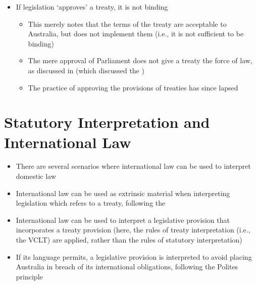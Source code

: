 \begin{itemize}
    \item If legislation `approves' a treaty, it is not binding
    \begin{itemize}
        \item This merely notes that the terms of the treaty are acceptable to Australia, but does not implement them (i.e., it is not sufficient to be binding)
        \item The mere approval of Parliament does not give a treaty the force of law, as discussed in  (which discussed the )
        \item The practice of approving the provisions of treaties has since lapsed
    \end{itemize}
\end{itemize}

\section{Statutory Interpretation and International Law}
\begin{itemize}
    \item There are several scenarios where international law can be used to interpret domestic law
    \item International law can be used as extrinsic material when interpreting legislation which refers to a treaty, following the 
    \item International law can be used to interpret a legislative provision that incorporates a treaty provision (here, the rules of treaty interpretation (i.e., the VCLT) are applied, rather than the rules of statutory interpretation)
    \item If its language permits, a legislative provision is interpreted to avoid placing Australia in breach of its international obligations, following the Polites principle
\end{itemize}


